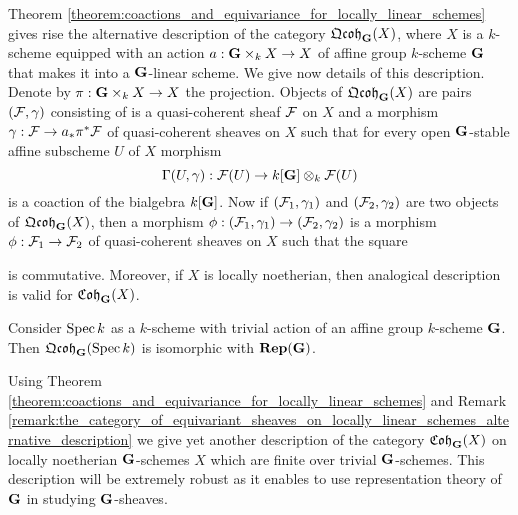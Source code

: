 \begin{remark}\label{remark:the_category_of_equivariant_sheaves_on_locally_linear_schemes_alternative_description}
Theorem \ref{theorem:coactions_and_equivariance_for_locally_linear_schemes} gives rise the alternative description of the category $\mathfrak{Qcoh}_{\mathbf{G}}(X)$, where $X$ is a $k$-scheme equipped with an action $a:\mathbf{G}\times_kX\rightarrow X$ of affine group $k$-scheme $\mathbf{G}$ that makes it into a $\mathbf{G}$-linear scheme. We give now details of this description. Denote by $\pi:\mathbf{G}\times_kX\rightarrow X$ the projection. Objects of $\mathfrak{Qcoh}_{\mathbf{G}}(X)$ are pairs $({\mathcal F},\gamma)$ consisting of is a quasi-coherent sheaf ${\mathcal F}$ on $X$ and a morphism $\gamma:{\mathcal F}\rightarrow a_*\pi^*{\mathcal F}$ of quasi-coherent sheaves on $X$ such that for every open $\mathbf{G}$-stable affine subscheme $U$ of $X$ morphism
$$\Gamma(U,\gamma):{\mathcal F}(U)\rightarrow k[\mathbf{G}]\otimes_k{\mathcal F}(U)$$
is a coaction of the bialgebra $k[\mathbf{G}]$. Now if $({\mathcal F}_1,\gamma_1)$ and $({\mathcal F}_2,\gamma_2)$ are two objects of $\mathfrak{Qcoh}_{\mathbf{G}}(X)$, then a morphism $\phi:({\mathcal F}_1,\gamma_1)\rightarrow ({\mathcal F}_2,\gamma_2)$ is a morphism $\phi:{\mathcal F}_1\rightarrow {\mathcal F}_2$ of quasi-coherent sheaves on $X$ such that the square
\begin{center}
\end{center}
is commutative. Moreover, if $X$ is locally noetherian, then analogical description is valid for $\mathfrak{Coh}_{\mathbf{G}}(X)$.
\end{remark}

\begin{example}\label{example:equivariant_objects_on_point}
Consider $\mathrm{Spec}\, k$ as a $k$-scheme with trivial action of an affine group $k$-scheme $\mathbf{G}$. Then $\mathfrak{Qcoh}_{\mathbf{G}}(\mathrm{Spec}\, k)$ is isomorphic with $\mathbf{Rep}(\mathbf{G})$.
\end{example}
\noindent
Using Theorem \ref{theorem:coactions_and_equivariance_for_locally_linear_schemes} and Remark \ref{remark:the_category_of_equivariant_sheaves_on_locally_linear_schemes_alternative_description} we give yet another description of the category $\mathfrak{Coh}_{\mathbf{G}}(X)$ on locally noetherian $\mathbf{G}$-schemes $X$ which are finite over trivial $\mathbf{G}$-schemes. This description will be extremely robust as it enables to use representation theory of $\mathbf{G}$ in studying $\mathbf{G}$-sheaves. 

